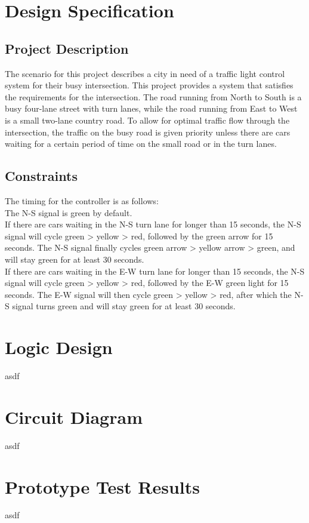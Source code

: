 \section{Design Specification}
\subsection{Project Description}
The scenario for this project describes a city in need of a traffic light control system for their busy intersection.
This project provides a system that satisfies the requirements for the intersection. The road running from North to South is a busy four-lane street with turn lanes,
while the road running from East to West is a small two-lane country road. To allow for optimal traffic flow through the intersection,
the traffic on the busy road is given priority unless there are cars waiting for a certain period of time on the small road or in the turn lanes.

\subsection{Constraints}
The timing for the controller is as follows:\\
The N-S signal is green by default.\\
If there are cars waiting in the N-S turn lane for longer than 15 seconds, the N-S signal will cycle green > yellow > red, followed by the green arrow for 15 seconds.
The N-S signal finally cycles green arrow > yellow arrow > green, and will stay green for at least 30 seconds.\\
If there are cars waiting in the E-W turn lane for longer than 15 seconds, the N-S signal will cycle green > yellow > red, followed by the E-W green light for 15 seconds.
The E-W signal will then cycle green > yellow > red, after which the N-S signal turns green and will stay green for at least 30 seconds.\\

\section{Logic Design}
asdf

\section{Circuit Diagram}
asdf

\section{Prototype Test Results}
asdf
